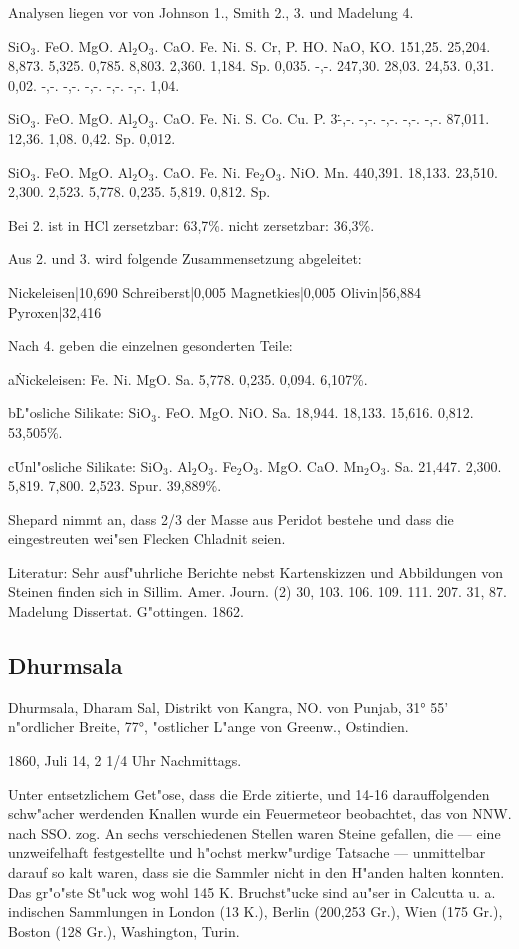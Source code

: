 \documentclass[a4paper, 11pt, oneside]{article}
\begin{document}
Analysen liegen vor von Johnson 1., Smith 2., 3. und Madelung 4.

SiO$_{3}$. FeO. MgO. Al$_{2}$O$_{3}$. CaO. Fe. Ni. S. Cr, P. HO. NaO, KO.  
1\. 51,25. 25,204. 8,873. 5,325. 0,785. 8,803. 2,360. 1,184. Sp. 0,035. -,-.  
2\. 47,30. 28,03. 24,53. 0,31. 0,02. -,-. -,-. -,-. -,-. -,-. 1,04.  

SiO$_{3}$. FeO. MgO. Al$_{2}$O$_{3}$. CaO. Fe. Ni. S. Co. Cu. P.  
3\. -,-. -,-. -,-. -,-. -,-. 87,011. 12,36. 1,08. 0,42. Sp. 0,012.  

SiO$_{3}$. FeO. MgO. Al$_{2}$O$_{3}$. CaO. Fe. Ni. Fe$_{2}$O$_{3}$. NiO. Mn.  
4\. 40,391. 18,133. 23,510. 2,300. 2,523. 5,778. 0,235. 5,819. 0,812. Sp.

Bei 2. ist in HCl zersetzbar: 63,7\%. nicht zersetzbar: 36,3\%.

Aus 2. und 3. wird folgende Zusammensetzung abgeleitet:

Nickeleisen|10,690  
Schreiberst|0,005  
Magnetkies|0,005  
Olivin|56,884  
Pyroxen|32,416

Nach 4. geben die einzelnen gesonderten Teile:

a\. Nickeleisen:  
Fe. Ni. MgO. Sa.  
5,778. 0,235. 0,094. 6,107\%.

b\. L"osliche Silikate:  
SiO$_{3}$. FeO. MgO. NiO. Sa.  
18,944. 18,133. 15,616. 0,812. 53,505\%.

c\. Unl"osliche Silikate:  
SiO$_{3}$. Al$_{2}$O$_{3}$. Fe$_{2}$O$_{3}$. MgO. CaO. Mn$_{2}$O$_{3}$. Sa.  
21,447. 2,300. 5,819. 7,800. 2,523. Spur. 39,889\%.

Shepard nimmt an, dass 2/3 der Masse aus Peridot bestehe und dass die eingestreuten wei"sen Flecken Chladnit seien.

Literatur: Sehr ausf"uhrliche Berichte nebst Kartenskizzen und Abbildungen von Steinen finden sich in Sillim. Amer. Journ. (2) 30, 103. 106. 109. 111. 207. 31, 87. Madelung Dissertat. G"ottingen. 1862.

\subsection{Dhurmsala}

Dhurmsala, Dharam Sal, Distrikt von Kangra, NO. von Punjab, 31° 55' n"ordlicher Breite, 77°, "ostlicher L"ange von Greenw., Ostindien.

1860, Juli 14, 2 1/4 Uhr Nachmittags.

Unter entsetzlichem Get"ose, dass die Erde zitierte, und 14-16 darauffolgenden schw"acher werdenden Knallen wurde ein Feuermeteor beobachtet, das von NNW. nach SSO. zog. An sechs verschiedenen Stellen waren Steine gefallen, die --- eine unzweifelhaft festgestellte und h"ochst merkw"urdige Tatsache --- unmittelbar darauf so kalt waren, dass sie die Sammler nicht in den H"anden halten konnten. Das gr"o"ste St"uck wog wohl 145 K. Bruchst"ucke sind au"ser in Calcutta u. a. indischen Sammlungen in London (13 K.), Berlin (200,253 Gr.), Wien (175 Gr.), Boston (128 Gr.), Washington, Turin.
\end{document}
